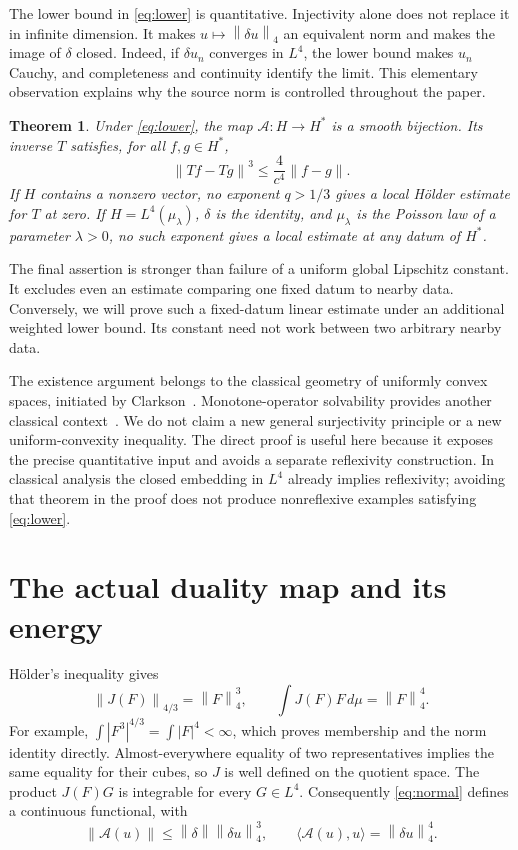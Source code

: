 \documentclass[11pt]{article}
\newtheorem{theorem}{Theorem}[section]
\theoremstyle{remark}\newtheorem{remark}[theorem]{Remark}
\newcommand{\norm}[1]{\left\lVert#1\right\rVert}
\newcommand{\pair}[2]{\langle #1,#2\rangle}
\newcommand{\A}{\mathcal A}
\begin{document}
The lower bound in \eqref{eq:lower} is quantitative. Injectivity alone
does not replace it in infinite dimension. It makes
$u\mapsto\norm{\delta u}_4$ an equivalent norm and makes the image of
$\delta$ closed. Indeed, if $\delta u_n$ converges in $L^4$, the lower
bound makes $u_n$ Cauchy, and completeness and continuity identify the
limit. This elementary observation explains why the source norm is
controlled throughout the paper.

\begin{theorem}\label{thm:overview}
Under \eqref{eq:lower}, the map $\A:H\to H^*$ is a smooth bijection.
Its inverse $T$ satisfies, for all $f,g\in H^*$,
\begin{equation}\label{eq:holder}
 \norm{Tf-Tg}^3\leq\frac4{c^4}\norm{f-g}.
\end{equation}
If $H$ contains a nonzero vector, no exponent $q>1/3$ gives a local
H\"older estimate for $T$ at zero. If $H=L^4(\mu_\lambda)$,
$\delta$ is the identity, and $\mu_\lambda$ is the Poisson law of a
parameter $\lambda>0$, no such exponent gives a local estimate at
\emph{any} datum of $H^*$.
\end{theorem}

The final assertion is stronger than failure of a uniform global
Lipschitz constant. It excludes even an estimate comparing one fixed
datum to nearby data. Conversely, we will prove such a fixed-datum
linear estimate under an additional weighted lower bound. Its constant
need not work between two arbitrary nearby data.

The existence argument belongs to the classical geometry of uniformly
convex spaces, initiated by Clarkson~\cite{clarkson}. Monotone-operator
solvability provides another classical context~\cite{minty,browder}.
We do not claim a new general surjectivity principle or a new
uniform-convexity inequality. The direct proof is useful here because
it exposes the precise quantitative input and avoids a separate
reflexivity construction. In classical analysis the closed embedding
in $L^4$ already implies reflexivity; avoiding that theorem in the proof
does not produce nonreflexive examples satisfying \eqref{eq:lower}.

\section{The actual duality map and its energy}
H\"older's inequality gives
\begin{equation}\label{eq:Jn}
 \norm{J(F)}_{4/3}=\norm{F}_4^3,
 \qquad \int J(F)F\,d\mu=\norm{F}_4^4.
\end{equation}
For example, $\int|F^3|^{4/3}=\int|F|^4<\infty$, which proves
membership and the norm identity directly. Almost-everywhere equality
of two representatives implies the same equality for their cubes,
so $J$ is well defined on the quotient space. The product
$J(F)G$ is integrable for every $G\in L^4$.
Consequently \eqref{eq:normal} defines a continuous functional, with
\begin{equation}\label{eq:Anorm}
 \norm{\A(u)}\leq\norm{\delta}\norm{\delta u}_4^3,
 \qquad \pair{\A(u)}u=\norm{\delta u}_4^4.
\end{equation}
\end{document}

